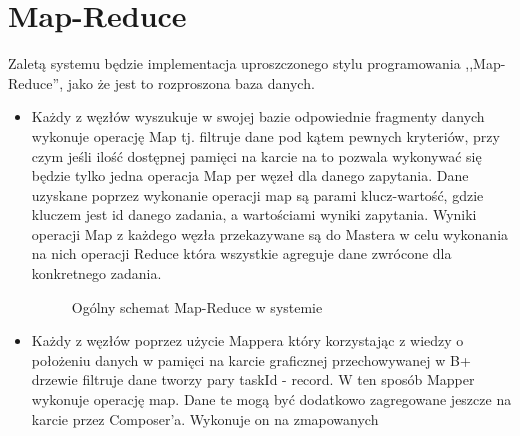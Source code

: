 \documentclass[paper=a4, fontsize=11pt]{scrartcl} %
\numberwithin{equation}{section} %
\numberwithin{figure}{section} %
\numberwithin{table}{section} %
\begin{document}
\section{Map-Reduce}
Zaletą systemu będzie implementacja uproszczonego stylu programowania ,,Map-Reduce'', jako że jest to rozproszona baza danych.
\begin{itemize}
	\item Każdy z węzłów wyszukuje w swojej bazie odpowiednie fragmenty danych wykonuje operację Map tj. filtruje dane pod kątem pewnych 
		kryteriów, przy czym jeśli ilość dostępnej pamięci na karcie na to pozwala wykonywać się będzie tylko jedna operacja Map per węzeł dla danego zapytania.
		Dane uzyskane poprzez wykonanie operacji map są parami klucz-wartość, gdzie kluczem jest id danego zadania, a wartościami wyniki zapytania. Wyniki
		operacji Map z każdego węzła przekazywane są do Mastera w celu wykonania na nich operacji Reduce która wszystkie agreguje dane zwrócone dla konkretnego zadania. 
		\begin{figure}[t]
			\begin{center}
				\caption{Ogólny schemat Map-Reduce w systemie}
			\end{center}
		\end{figure}
	\item Każdy z węzłów poprzez użycie Mappera który korzystając z wiedzy o położeniu danych w pamięci na karcie graficznej przechowywanej w B+ drzewie filtruje dane tworzy
		pary taskId - record. W ten sposób Mapper wykonuje operację map. Dane te mogą być dodatkowo zagregowane jeszcze na karcie przez Composer'a. Wykonuje on na zmapowanych

\end{itemize}
\end{document}
